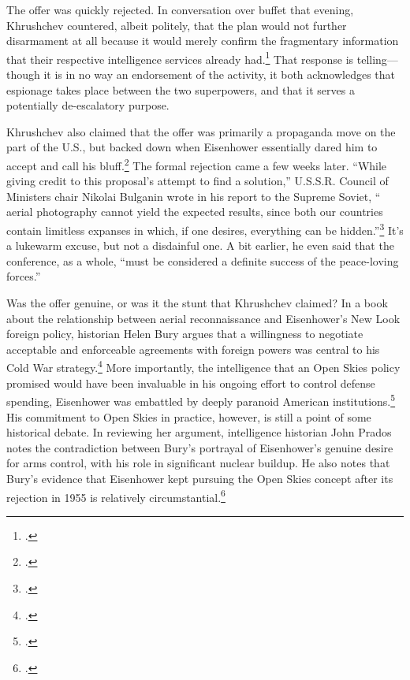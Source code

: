 \documentclass[12pt]{article}
\begin{document}
The offer was quickly rejected. In conversation over buffet that evening, Khrushchev countered, albeit politely, that the plan would not further disarmament at all because it would merely confirm the fragmentary information that their respective intelligence services already had.\footcite{department_of_state_memorandum_1955} That response is telling---though it is in no way an endorsement of the activity, it both acknowledges that espionage takes place between the two superpowers, and that it serves a potentially de-escalatory purpose.

Khrushchev also claimed that the offer was primarily a propaganda move on the part of the U.S., but backed down when Eisenhower essentially dared him to accept and call his bluff.\footcite[p.~2. This is a secondary source---the book cites a conversation by Eisenhower, quoted in NSC meeting memos that are stored in the Eisenhower library.]{bury_eisenhower_2014} The formal rejection came a few weeks later. ``While giving credit to this proposal's attempt to find a solution,'' U.S.S.R. Council of Ministers chair Nikolai Bulganin wrote in his report to the Supreme Soviet, ``\textelp{} aerial photography cannot yield the expected results, since both our countries contain limitless expanses in which, if one desires, everything can be hidden.''\footcite{bulganin_meetings_1955} It's a lukewarm excuse, but not a disdainful one. A bit earlier, he even said that the conference, as a whole, ``must be considered a definite success of the peace-loving forces.''

Was the offer genuine, or was it the stunt that Khrushchev claimed? In a book about the relationship between aerial reconnaissance and Eisenhower's New Look foreign policy, historian Helen Bury argues that a willingness to negotiate acceptable and enforceable agreements with foreign powers was central to his Cold War strategy.\footcite[p.~69]{bury_eisenhower_2014} More importantly, the intelligence that an Open Skies policy promised would have been invaluable in his ongoing effort to control defense spending, Eisenhower was embattled by deeply paranoid American institutions.\footcite[p.~212]{bury_eisenhower_2014} His commitment to Open Skies in practice, however, is still a point of some historical debate. In reviewing her argument, intelligence historian John Prados notes the contradiction between Bury's portrayal of Eisenhower's genuine desire for arms control, with his role in significant nuclear buildup. He also notes that Bury's evidence that Eisenhower kept pursuing the Open Skies concept after its rejection in 1955 is relatively circumstantial.\footcite[p.~233-234]{prados_review_2015}
\end{document}
